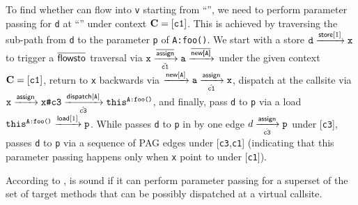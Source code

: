 To find whether  can flow into \texttt{v} starting from 
``'', we need to perform parameter passing
for \texttt{d} at ``'' under context
$\textbf{C}=[\texttt{c1}]$. This is achieved 
by traversing the  sub-path   from  \texttt{d} to
 the parameter \texttt{p} of \texttt{A:foo()}.  
We start with 
a store 
$\texttt{d}\xrightarrow{\textsf{store}[1]}\texttt{x}$
to trigger a 
 $\overline{\textsf{flowsto}}$ traversal via
$\texttt{x} \xrightarrow[\check{\texttt{c1}}]{\overline{\textsf{assign}}}\texttt{a} \xrightarrow{\overline{\textsf{new[\texttt{A}]}}}$ 
 under the given context $\textbf{C}=[\texttt{c1}]$,
return to \texttt{x}  backwards via
$\xrightarrow{\textsf{new}[\texttt{A}]} \texttt{a}
\xrightarrow[\hat{\texttt{c1}}] {\textsf{assign}} \texttt{x}$, dispatch at the callsite
via $
\texttt{x}
\xrightarrow{\textsf{assign}} \texttt{x\#c3} \xrightarrow[\hat{\texttt{c3}}]{\textsf{dispatch}[\texttt{A}]} 
\texttt{this}^{\texttt{A:foo()}} $, and finally, pass \texttt{d} to 
\texttt{p} via a load
$\texttt{this}^\texttt{A:foo()}
\xrightarrow{\textsf{load}[1]}\texttt{p}$.
While \manuLFC passes \texttt{d} to \texttt{p}
in 
 by one  \assign edge $d\xrightarrow[\hat{{\mathtt{c3}}}]{\textsf{assign}} \mathtt{p}$ under [\texttt{c3}],
\LFC passes 
\texttt{d}    to \texttt{p}  via a sequence of PAG edges  under [\texttt{c3},\texttt{c1}] (indicating
that this parameter passing happens only when \texttt{x} point to
 under  [\texttt{c1}]).

According to , \LFC is sound if it can perform parameter passing
for a superset of 
the set of target methods that can be possibly dispatched at a virtual callsite.

